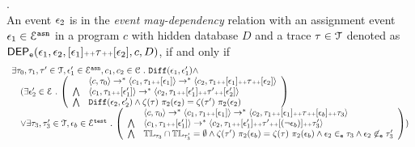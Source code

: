 %
\begin{defn}.
\label{def:event_dep}
\\ 
  An event $\mathtt{\epsilon}_2$ is in the \emph{event may-dependency} relation with an assignment
  event $\mathtt{\epsilon}_1 \in \mathcal{E}^{\mathtt{{asn}}}$ in a program ${c}$
  with hidden database $D$ and a trace $\mathtt{\tau} \in \mathcal{T}$ denoted as 
  $\mathsf{DEP_{\mathtt{e}}}(\mathtt{\epsilon}_1, \mathtt{\epsilon}_2, [\mathtt{\epsilon}_1 ] {\scriptscriptstyle ++} \mathtt{\tau} {\scriptscriptstyle ++} [\mathtt{\epsilon}_2], c, D)$, if and only if
  \[
    \begin{array}{l}
  \exists \vtrace_0,
  \vtrace_1, \vtrace' \in \mathcal{T},\event_1' \in \eventset^{\asn}, {c}_1, {c}_2  \in \cdom  \st
  \diff(\event_1, \event_1') \land 
      \\ \quad
      (
        \exists  \event_2' \in \eventset \st 
    \left(
    \begin{array}{ll}   
   & \config{{c}, \vtrace_0} \rightarrow^{*} 
  \config{{c}_1, \vtrace_1 \tracecat [\event_1]}  \rightarrow^{*} 
    \config{{c}_2,  \vtrace_1 \tracecat [\event_1] \tracecat \vtrace \tracecat [\event_2] } 
   \\ 
   \bigwedge &
    \config{{c}_1, \vtrace_1 \tracecat [\event_1']}  \rightarrow^{*} 
    \config{{c}_2,  \vtrace_1 \tracecat[ \event_1'] \tracecat \vtrace' \tracecat [\event_2'] } 
  \\
  \bigwedge & 
  \diff(\event_2,\event_2' ) \land 
  \vcounter(\vtrace) ~ \pi_2(\event_2)
  = 
  \vcounter(\vtrace') ~ \pi_2(\event_2)\\
  \end{array}
  \right)
  \\ \quad
  \lor 
  \exists \vtrace_3, \vtrace_3'  \in \mathcal{T}, \event_b \in \eventset^{\test} \st 
  \left(
  \begin{array}{ll}   
    & \config{{c}, \vtrace_0} \rightarrow^{*} 
      \config{{c}_1, \vtrace_1 \tracecat [\event_1]}  \rightarrow^{*} 
      \config{c_2,  \vtrace_1 \tracecat [\event_1] \tracecat \trace \tracecat [\event_b] \tracecat  \trace_3} 
    \\ 
    \bigwedge &
    \config{{c}_1, \vtrace_1 \tracecat [\event_1']}  \rightarrow^{*} 
    \config{c_2,  \vtrace_1 \tracecat [\event_1'] \tracecat \trace' \tracecat [(\neg \event_b)] \tracecat \trace_3'} 
    \\
    \bigwedge &  \tlabel_{\trace_3} \cap \tlabel_{\trace_3'} = \emptyset
     \land \vcounter(\trace') ~  \pi_2(\event_b) = \vcounter(\trace) ~  \pi_2(\event_b)
      \land \event_2 \eventin \trace_3
    \land \event_2 \not\eventin \trace_3'
  \end{array}
  \right)
  )
\end{array}
   \]
%
\end{defn}
%

